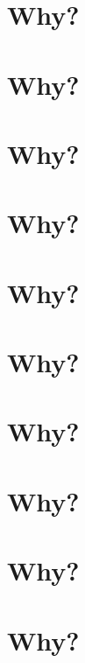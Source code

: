 \documentclass[draft]{memoir}
\begin{document}
\frontmatter

\tableofcontents*

\mainmatter

\chapter{Why?}
\kant[1-100]
\chapter{Why?}
\kant[1-100]
\chapter{Why?}
\kant[1-100]
\chapter{Why?}
\kant[1-100]
\chapter{Why?}
\kant[1-100]
\chapter{Why?}
\kant[1-100]
\chapter{Why?}
\kant[1-100]
\chapter{Why?}
\kant[1-100]
\chapter{Why?}
\kant[1-100]
\chapter{Why?}
\kant[1-100]
\end{document}
